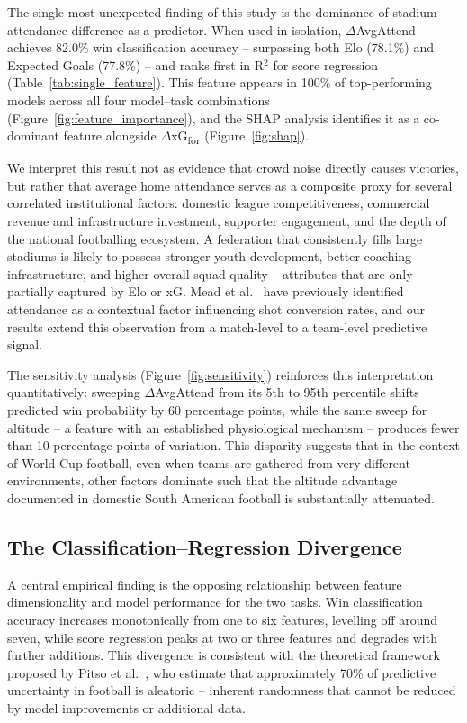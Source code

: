 \documentclass[a4paper,twoside]{article}
\begin{document}
The single most unexpected finding of this study is the dominance of stadium attendance difference as a predictor.
When used in isolation, $\Delta$AvgAttend achieves 82.0\% win classification accuracy -- surpassing both Elo (78.1\%) and Expected Goals (77.8\%) -- and ranks first in R$^{2}$ for score regression (Table~\ref{tab:single_feature}).
This feature appears in 100\% of top-performing models across all four model--task combinations (Figure~\ref{fig:feature_importance}), and the SHAP analysis identifies it as a co-dominant feature alongside $\Delta$xG\textsubscript{for} (Figure~\ref{fig:shap}).

We interpret this result not as evidence that crowd noise directly causes victories, but rather that average home attendance serves as a composite proxy for several correlated institutional factors: domestic league competitiveness, commercial revenue and infrastructure investment, supporter engagement, and the depth of the national footballing ecosystem.
A federation that consistently fills large stadiums is likely to possess stronger youth development, better coaching infrastructure, and higher overall squad quality -- attributes that are only partially captured by Elo or xG.
Mead et al.\ \cite{mead_expected_2023} have previously identified attendance as a contextual factor influencing shot conversion rates, and our results extend this observation from a match-level to a team-level predictive signal.

The sensitivity analysis (Figure~\ref{fig:sensitivity}) reinforces this interpretation quantitatively: sweeping $\Delta$AvgAttend from its 5th to 95th percentile shifts predicted win probability by 60 percentage points, while the same sweep for altitude -- a feature with an established physiological mechanism \cite{shephard_altitude_2008} -- produces fewer than 10 percentage points of variation.
This disparity suggests that in the context of World Cup football, even when teams are gathered from very different environments, other factors dominate such that the altitude advantage documented in domestic South American football is substantially attenuated.

\subsection{The Classification--Regression Divergence}

A central empirical finding is the opposing relationship between feature dimensionality and model performance for the two tasks.
Win classification accuracy increases monotonically from one to six features, levelling off around seven, while score regression peaks at two or three features and degrades with further additions.
This divergence is consistent with the theoretical framework proposed by Pitso et al.\ \cite{pitso_bayesian_2026}, who estimate that approximately 70\% of predictive uncertainty in football is aleatoric -- inherent randomness that cannot be reduced by model improvements or additional data.
\end{document}
